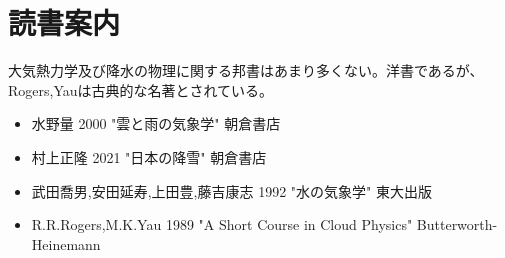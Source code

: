 \documentclass{jsarticle}
\begin{document}
\section{読書案内}
大気熱力学及び降水の物理に関する邦書はあまり多くない。洋書であるが、Rogers,Yauは古典的な名著とされている。
\begin{itemize}
\item 水野量 2000 "雲と雨の気象学" 朝倉書店
\item 村上正隆 2021 "日本の降雪" 朝倉書店
\item 武田喬男,安田延寿,上田豊,藤吉康志 1992 "水の気象学" 東大出版
\item R.R.Rogers,M.K.Yau 1989 "A Short Course in Cloud Physics" Butterworth-Heinemann
\end{itemize}
\end{document}
